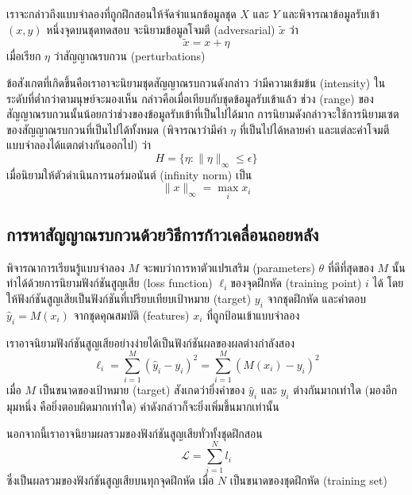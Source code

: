 \documentclass{cpepaper}
\begin{document}
\begin{multicols*}{2}
เราจะกล่าวถึงแบบจำลองที่ถูกฝึกสอนให้จัดจำแนกข้อมูลชุด $X$ และ $Y$ และพิจารณาข้อมูลรับเข้า $(x, y)$ หนึ่งจุดบนชุดทดสอบ จะนิยามข้อมูลโจมตี (adversarial) $\tilde{x}$ ว่า
\begin{equation}
    \tilde{x} = x + \eta
\end{equation}
เมื่อเรียก $\eta$ ว่าสัญญาณรบกวน (perturbations)

ข้อสังเกตที่เกิดขึ้นคือเราอาจะนิยามชุดสัญญาณรบกวนดังกล่าว ว่ามีความเข้มข้น (intensity) ในระดับที่ต่ำกว่าตามนุษย์จะมองเห็น กล่าวคือเมื่อเทียบกับชุดข้อมูลรับเข้าแล้ว ช่วง (range) ของสัญญาณรบกวนนั้นน้อยกว่าช่วงของข้อมูลรับเข้าที่เป็นไปได้มาก การนิยามดังกล่าวจะใช้การนิยามเซตของสัญญาณรบกวนที่เป็นไปได้ทั้งหมด (พิจารณาว่ามีค่า $\eta$ ที่เป็นไปได้หลายค่า และแต่ละค่าโจมตีแบบจำลองได้แตกต่างกันออกไป) ว่า
\begin{equation}
    H = \{ \eta: \|\eta\|_\infty \leq \epsilon\}
\end{equation}
เมื่อนิยามให้ตัวดำเนินการนอร์มอนันต์ (infinity norm) เป็น
\begin{equation}
    \|x\|_\infty = \max_i{x_i}
\end{equation}

\subsection{การหาสัญญาณรบกวนด้วยวิธีการก้าวเคลื่อนถอยหลัง}

พิจารณาการเรียนรู้แบบจำลอง $M$ จะพบว่าการหาตัวแปรเสริม (parameters) $\theta$ ที่ดีที่สุดของ $M$ นั้นทำได้ด้วยการนิยามฟังก์ชันสูญเสีย (loss function) $\ell_i $ของจุดฝึกหัด (training point) $i$ ได้ โดยให้ฟังก์ชันสูญเสียเป็นฟังก์ชันที่เปรียบเทียบเป้าหมาย (target) $y_i$ จากชุดฝึกหัด และคำตอบ $\hat{y}_i = M(x_i)$ จากชุดคุณสมบัติ (features) $x_i$ ที่ถูกป้อนเข้าแบบจำลอง

เราอาจนิยามฟังก์ชันสูญเสียอย่างง่ายได้เป็นฟังก์ชันผลของผลต่างกำลังสอง
\begin{equation}
    \ell_i = \sum_{i=1}^{M}{(\hat{y}_i - y_i)^2} = \sum_{i=1}^{M}{(M(x_i) - y_i)^2}
\end{equation}
เมื่อ $M$ เป็นขนาดของเป้าหมาย (target) สังเกดว่ายิ่งค่าของ $\hat{y}_i$ และ $y_i$ ต่างกันมากเท่าใด (มองอีกมุมหนึ่ง คือยิ่งตอบผิดมากเท่าใด) ค่าดังกล่าวก็จะยิ่งเพิ่มขึ้นมากเท่านั้น

นอกจากนี้เราอาจนิยามผลรวมของฟังก์ชันสูญเสียทั่วทั้งชุดฝึกสอน
\begin{equation}
    \mathcal{L} = \sum_{i=1}^{N}{l_i}
\end{equation}
ซึ่งเป็นผลรวมของฟังก์ชันสูญเสียบนทุกจุดฝึกหัด เมื่อ $N$ เป็นขนาดของชุดฝึกหัด (training set)


\end{multicols*}
\end{document}
